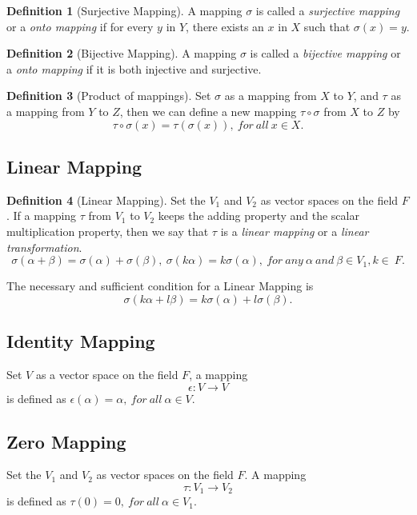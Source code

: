 \documentclass{article}
\theoremstyle{definition}
\newtheorem{defi}{Definition}[section]
\begin{document}
\begin{defi}[Surjective Mapping]
    A mapping $\sigma$ is called a \textit{surjective mapping} or a \textit{onto mapping}
    if for every $y$ in $Y$, there exists an $x$ in $X$ such that $\sigma(x)=y$.
\end{defi}

\begin{defi}[Bijective Mapping]
    A mapping $\sigma$ is called a \textit{bijective mapping} or a \textit{onto mapping}
    if it is both injective and surjective.
\end{defi}

\begin{defi}[Product of mappings]
    Set $\sigma$ as a mapping from $X$ to $Y$, and $\tau$ as a mapping from $Y$ to $Z$, 
    then we can define a new mapping $\tau\circ\sigma$ from $X$ to $Z$ by
    $$\tau\circ\sigma(x)=\tau(\sigma(x)),\ for\ all\ x\in X.$$
\end{defi}

\subsection{Linear Mapping}
\begin{defi}[Linear Mapping]
    Set the $V_{1}$ and $V_{2}$ as vector spaces on the field $F$. 
    If a mapping $\tau$ from $V_{1}$ to $V_{2}$ keeps the adding property and the scalar 
    multiplication property, then we say that $\tau$ is a \textit{linear mapping} or a
    \textit{linear transformation}.
    $$\sigma (\alpha + \beta) = \sigma (\alpha) + \sigma (\beta),\ \sigma (k\alpha)=k\sigma (\alpha),\ for\ any\ \alpha\ and\ \beta\in V_{1},k\in \ F.$$
\end{defi}

The necessary and sufficient condition for a Linear Mapping is 
$$\sigma (k\alpha +l\beta) = k\sigma(\alpha)+l\sigma(\beta).$$

\subsection{Identity Mapping}
Set $V$ as a vector space on the field $F$, a mapping $$\epsilon:V\rightarrow V$$
is defined as $\epsilon (\alpha)=\alpha,\ for\ all\ \alpha\in V.$
\subsection{Zero Mapping}
Set the $V_{1}$ and $V_{2}$ as vector spaces on the field $F$.
A mapping $$\tau :V_{1}\rightarrow V_{2}$$ 
is defined as $\tau (0)=0,\ for\ all\ \alpha\in V_{1}.$
\end{document}
